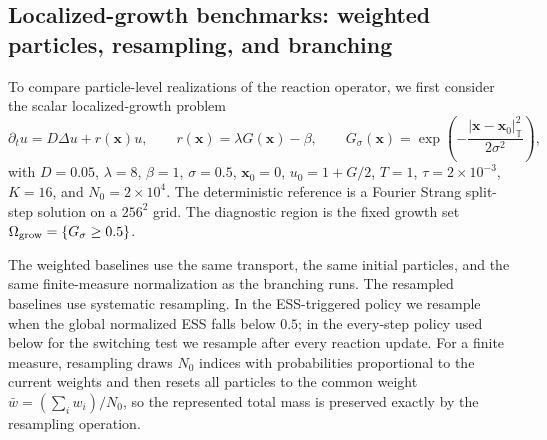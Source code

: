 \subsection{Localized-growth benchmarks: weighted particles, resampling, and branching}
\label{sec:branch_vs_weight}
To compare particle-level realizations of the reaction operator, we first consider the
scalar localized-growth problem
\begin{equation}
\partial_t u=D\Delta u+r(\mathbf x)u,
\qquad
r(\mathbf x)=\lambda G(\mathbf x)-\beta,
\qquad
G_\sigma(\mathbf x)=\exp\!\left(-\frac{|\mathbf x-\mathbf x_0|_{\mathbb T}^2}{2\sigma^2}\right),
\label{equ:loc_growth}
\end{equation}
with \(D=0.05\), \(\lambda=8\), \(\beta=1\), \(\sigma=0.5\), \(\mathbf x_0=0\),
\(u_0=1+G/2\), \(T=1\), \(\tau=2\times10^{-3}\), \(K=16\), and
\(N_0=2\times10^4\).  The deterministic reference is a Fourier Strang split-step
solution on a \(256^2\) grid.  The diagnostic region is the fixed growth set
\(\Omega_{\rm grow}=\{G_\sigma\ge 0.5\}\).

The weighted baselines use the same transport, the same initial particles, and the same
finite-measure normalization as the branching runs.  The resampled baselines use
systematic resampling.  In the ESS-triggered policy we resample when the global
normalized ESS falls below \(0.5\); in the every-step policy used below for the switching
test we resample after every reaction update.  For a finite measure, resampling draws
\(N_0\) indices with probabilities proportional to the current weights and then resets all
particles to the common weight \(\bar w=(\sum_i w_i)/N_0\), so the represented total mass
is preserved exactly by the resampling operation.

